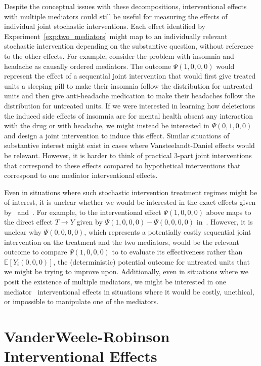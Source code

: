 Despite the conceptual issues with these decompositions, interventional effects with multiple mediators
could still be useful for measuring the effects of individual 
joint stochastic interventions. Each effect identified by Experiment~\ref{exp:two_mediators} might map to an
individually relevant stochastic intervention depending on the substantive question, without reference 
to the other effects. For example, consider the problem with insomnia and headache as causally ordered
mediators. The outcome $\Psi(1,0,0,0)$ would represent the effect of a sequential joint intervention 
that would first give treated units a sleeping pill to make their insomnia follow the distribution for 
untreated units and then give anti-headache medication to make their headaches follow the 
distribution for untreated units. If we were interested in learning how deleterious the induced side effects 
of insomnia are for mental health absent any interaction with the drug or with headache, we might instead 
be interested in $\Psi(0,1,0,0)$ and design a joint intervention to induce this effect. Similar situations 
of substantive interest might exist in cases where Vansteelandt-Daniel effects would be relevant. However, 
it is harder to think of practical 3-part joint interventions that correspond to these effects compared to 
hypothetical interventions that correspond to one mediator interventional effects. 

Even in situations where such stochastic intervention treatment regimes might be of interest, it is unclear
whether we would be interested in the exact effects given by~\cite{linvanderweele2017} 
and~\cite{vansteelandtdaniel2017}. For example, to the interventional effect $\Psi(1,0,0,0)$ 
above maps to the direct effect $T \rightarrow Y$ given by $\Psi(1,0,0,0) - \Psi(0,0,0,0)$
in~\cite{linvanderweele2017}. However, it is unclear why $\Psi(0,0,0,0)$, which represents a potentially costly
sequential joint intervention on the treatment and the two mediators, would be the relevant outcome to 
compare $\Psi(1,0,0,0)$ to to evaluate its effectiveness rather than $\mathbb{E}[Y_{i}(0,0,0)]$, the 
(deterministic) potential outcome for untreated units that we might be trying to improve upon. Additionally, 
even in situations where we posit the existence of multiple mediators, we might be interested
in one mediator~\cite{vanderweeleetal2014} interventional effects in situations where it would be costly,
unethical, or impossible to manipulate one of the mediators. 


\section{VanderWeele-Robinson Interventional Effects}\label{section:vr_int_eff}

